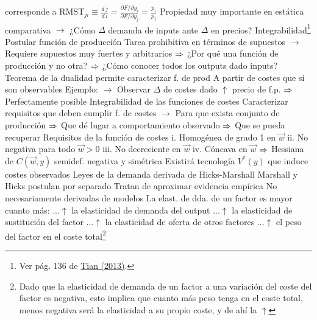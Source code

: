 \documentclass{nuevotema}
\begin{document}
\begin{esquemal}
{				corresponde a $\text{RMST}_{ji} \equiv \frac{d \, j}{d \, i} = \frac{\partial F / \partial y_i}{\partial F / \partial y_j} = \frac{p_i}{p_j}$ }
				\4 Propiedad muy importante en estática comparativa
				\4[] $\to$ ¿Cómo $\varDelta$ demanda de inputs ante $\varDelta$ en precios?
			\3 Integrabilidad\footnote{Ver pág. 136 de \href{http://people.tamu.edu/~gtian/micro1.pdf}{Tian (2013)}.}
				\4 Postular función de producción
				\4[] Tarea prohibitiva en términos de supuestos
				\4[] $\to$ Requiere supuestos muy fuertes y arbitrarios
				\4[] $\then$ ¿Por qué una función de producción y no otra?
				\4[] $\then$ ¿Cómo conocer todos los outputs dado inputs?
				\4 Teorema de la dualidad permite caracterizar f. de prod
				\4[] A partir de costes que sí son observables
				\4[] Ejemplo:
				\4[] $\to$ Observar $\Delta$ de costes dado $\uparrow$ precio de f.p.
				\4[] $\then$ Perfectamente posible
				\4 Integrabilidad de las funciones de costes
				\4[] Caracterizar requisitos que deben cumplir f. de costes
				\4[] $\to$ Para que exista conjunto de producción
				\4[] $\then$ Que dé lugar a comportamiento observado
				\4[] $\then$ Que se pueda recuperar
				\4 Requisitos de la función de costes
				\4[] i. Homogénea de grado 1 en $\vec{w}$
				\4[] ii. No negativa para todo $\vec{w} > 0$
				\4[] iii. No decreciente en $\vec{w}$
				\4[] iv. Cóncava en $\vec{w}$
				\4[] $\then$ Hessiana de $C(\vec{w},y)$ semidef. negativa y simétrica
				\4[$\then$] Existirá tecnología $V^*(y)$ que induce costes observados
			\3 Leyes de la demanda derivada de Hicks-Marshall
				\4 Marshall y Hicks postulan por separado
				\4 Tratan de aproximar evidencia empírica
				\4[] No necesariamente derivadas de modelos
				\4[] La elast. de dda. de un factor es mayor cuanto más:
				\4[1] ...$\uparrow$ la elasticidad de demanda del output
				\4[2] ...$\uparrow$ la elasticidad de sustitución del factor
				\4[3] ...$\uparrow$ la elasticidad de oferta de otros factores
				\4[4] ...$\uparrow$ el peso del factor en el coste total\footnote{Dado que la elasticidad de demanda de un factor a una variación del coste del factor es negativa, esto implica que cuanto más peso tenga en el coste total, menos negativa será la elasticidad a su propio coste, y de ahí la $\uparrow$}

\end{esquemal}
\end{document}
